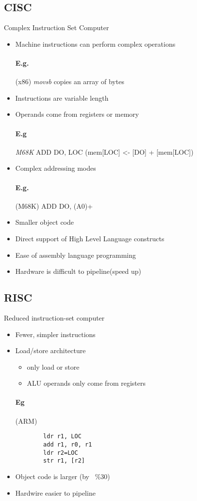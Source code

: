     \subsection{CISC} Complex Instruction Set Computer\\
      \begin{itemize}
        \item Machine instructions can perform complex operations
        \paragraph{E.g.} (x86) \textit{movsb} copies an array of bytes
        \item Instructions are variable length
        \item Operands come from registers or memory
        \paragraph{E.g} \textit{M68K} ADD DO, LOC (mem[LOC] \textless- [DO] +
        [mem[LOC])
        \item Complex addressing modes
        \paragraph{E.g.} (M68K) ADD DO, (A0)+
        \item Smaller object code
        \item Direct support of High Level Language constructs
        \item Ease of assembly language programming
        \item Hardware is difficult to pipeline(speed up)
      \end{itemize}

    \subsection{RISC}
      Reduced instruction-set computer
      \begin{itemize}
        \item Fewer, simpler instructions
        \item Load/store architecture
        \begin{itemize}
          \item only load or store
          \item ALU operands only come from registers
        \end{itemize}
      \paragraph{Eg} (ARM)
      \begin{lstlisting}
        ldr r1, LOC
        add r1, r0, r1
        ldr r2=LOC
        str r1, [r2]
      \end{lstlisting}
      \item Object code is larger (by ~\%30)
      \item Hardwire easier to pipeline
      \end{itemize}

